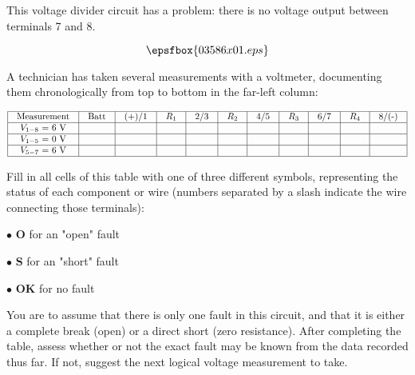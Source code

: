 

This voltage divider circuit has a problem: there is no voltage output between terminals 7 and 8.

$$\epsfbox{03586x01.eps}$$

A technician has taken several measurements with a voltmeter, documenting them chronologically from top to bottom in the far-left column:


$$\vbox{\offinterlineskip
\halign{\strut
\vrule \quad\hfil # \ \hfil & 
\vrule \quad\hfil # \ \hfil & 
\vrule \quad\hfil # \ \hfil & 
\vrule \quad\hfil # \ \hfil & 
\vrule \quad\hfil # \ \hfil & 
\vrule \quad\hfil # \ \hfil & 
\vrule \quad\hfil # \ \hfil & 
\vrule \quad\hfil # \ \hfil & 
\vrule \quad\hfil # \ \hfil & 
\vrule \quad\hfil # \ \hfil & 
\vrule \quad\hfil # \ \hfil \vrule \cr
\noalign{\hrule}
%
Measurement & Batt & (+)/1 & $R_1$ & 2/3 & $R_2$ & 4/5 & $R_3$ & 6/7 & $R_4$ & 8/(-) \cr
%
\noalign{\hrule}
%
$V_{1-8}$ = 6 V  &      &       &        &    &       &     &       &     &       &       \cr
%
\noalign{\hrule}
%
$V_{1-5}$ = 0 V  &      &       &        &    &       &     &       &     &       &       \cr
%
\noalign{\hrule}
%
$V_{5-7}$ = 6 V  &      &       &        &    &       &     &       &     &       &       \cr
%
\noalign{\hrule}
} %
}$$ %

\goodbreak
Fill in all cells of this table with one of three different symbols, representing the status of each component or wire (numbers separated by a slash indicate the wire connecting those terminals):

\medskip
\item{$\bullet$} {\bf O} for an "open" fault
\item{$\bullet$} {\bf S} for an "short" fault
\item{$\bullet$} {\bf OK} for no fault
\medskip

You are to assume that there is only one fault in this circuit, and that it is either a complete break (open) or a direct short (zero resistance).  After completing the table, assess whether or not the exact fault may be known from the data recorded thus far.  If not, suggest the next logical voltage measurement to take.

